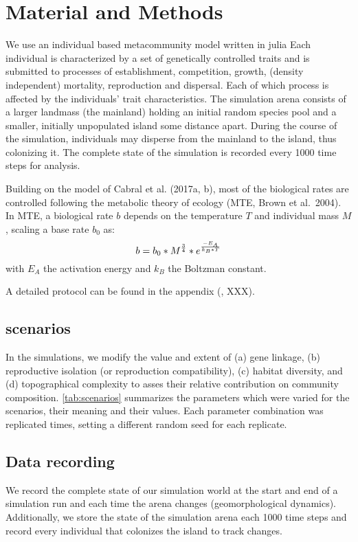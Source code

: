 \documentclass[a4paper]{scrartcl}
\begin{document}
\section{Material and Methods}
We use an individual based metacommunity model written in julia %
Each individual is characterized by a set of genetically controlled traits and is submitted to processes of
establishment, competition, growth, (density independent) mortality, reproduction and dispersal.
Each of which process is affected by the individuals' trait characteristics.
The simulation arena consists of a larger landmass (the mainland) holding an initial random species pool and a smaller, initially unpopulated island some distance apart.
During the course of the simulation, individuals may disperse from the mainland to the island, thus colonizing it.
The complete state of the simulation is recorded every 1000 time steps for analysis.

Building on the model of Cabral et al. (2017a, b), most of the biological rates are controlled following the metabolic theory
of ecology (MTE, Brown et al.\ 2004).
In MTE, a biological rate $b$ depends on the temperature $T$ and individual mass $M$, scaling a base rate $b_0$ as:
\begin{equation}
  b=b_0*M^{3\over4}*e^{-{E_A}\over{k_B*T}}
  \label{eq:MTE}
\end{equation}
with $E_A$ the activation energy and $k_B$ the Boltzman constant.

A detailed protocol can be found in the appendix (\cite{grimm2010odd}, XXX).

\subsection{scenarios}
In the simulations, we modify the value and extent of
(a) gene linkage,
(b) reproductive isolation (or reproduction compatibility),
(c) habitat diversity, and
(d) topographical complexity
to asses their relative contribution on community composition.
\cref{tab:scenarios} summarizes the parameters which were varied for the scenarios, their meaning and their values. %
Each parameter combination was replicated %
times, setting a different random seed for each replicate.

\subsection{Data recording}
We record the complete state of our simulation world at the start and end of a simulation run and each time the arena changes (geomorphological dynamics).
Additionally, we store the state of the simulation arena each 1000 %
time steps and record every individual that colonizes the island to track changes.
\end{document}
